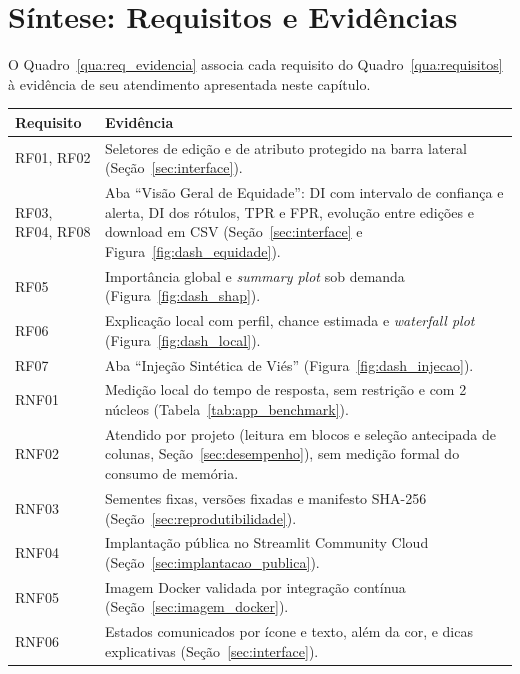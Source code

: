 \section{Síntese: Requisitos e Evidências}
\label{sec:req_evidencia}

O Quadro~\ref{qua:req_evidencia} associa cada requisito do Quadro~\ref{qua:requisitos} à evidência de seu atendimento apresentada neste capítulo.

\begin{quadro}[htbp]
\centering
\caption{Requisitos do artefato e evidências de atendimento}
\label{qua:req_evidencia}
\small
\begin{tabular}{|>{\raggedright\arraybackslash}p{2.2cm}|>{\raggedright\arraybackslash}p{12.3cm}|}
\hline
\textbf{Requisito} & \textbf{Evidência} \\ \hline
RF01, RF02 & Seletores de edição e de atributo protegido na barra lateral (Seção~\ref{sec:interface}). \\ \hline
RF03, RF04, RF08 & Aba ``Visão Geral de Equidade'': DI com intervalo de confiança e alerta, DI dos rótulos, TPR e FPR, evolução entre edições e download em CSV (Seção~\ref{sec:interface} e Figura~\ref{fig:dash_equidade}). \\ \hline
RF05 & Importância global e \textit{summary plot} sob demanda (Figura~\ref{fig:dash_shap}). \\ \hline
RF06 & Explicação local com perfil, chance estimada e \textit{waterfall plot} (Figura~\ref{fig:dash_local}). \\ \hline
RF07 & Aba ``Injeção Sintética de Viés'' (Figura~\ref{fig:dash_injecao}). \\ \hline
RNF01 & Medição local do tempo de resposta, sem restrição e com 2 núcleos (Tabela~\ref{tab:app_benchmark}). \\ \hline
RNF02 & Atendido por projeto (leitura em blocos e seleção antecipada de colunas, Seção~\ref{sec:desempenho}), sem medição formal do consumo de memória. \\ \hline
RNF03 & Sementes fixas, versões fixadas e manifesto SHA-256 (Seção~\ref{sec:reprodutibilidade}). \\ \hline
RNF04 & Implantação pública no Streamlit Community Cloud (Seção~\ref{sec:implantacao_publica}). \\ \hline
RNF05 & Imagem Docker validada por integração contínua (Seção~\ref{sec:imagem_docker}). \\ \hline
RNF06 & Estados comunicados por ícone e texto, além da cor, e dicas explicativas (Seção~\ref{sec:interface}). \\ \hline
\end{tabular}
\end{quadro}

